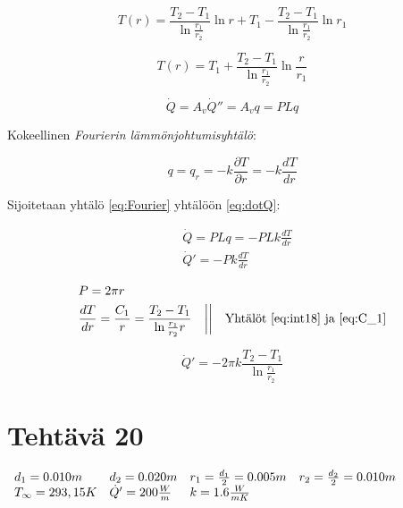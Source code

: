 \documentclass[12pt,a4paper,finnish]{article}
\begin{document}
\begin{equation}
 T(r) = \frac{T_2 - T_1}{\ln \frac{r_1}{r_2}}\ln r + T_1 - \frac{T_2 - T_1}{\ln \frac{r_1}{r_2}}\ln r_1
\end{equation}

\begin{framed}
  \begin{equation}
  T(r) = T_1 + \frac{T_2 - T_1}{\ln \frac{r_1}{r_2}}\ln \frac{r}{r_1}
  \end{equation}
\end{framed}

\begin{equation}
 \label{eq:dotQ}
 \dot{Q} = A_v\dot{Q}'' = A_vq = PLq
\end{equation}

Kokeellinen \textit{Fourierin lämmönjohtumisyhtälö}:

\begin{equation}
 \label{eq:Fourier}
 q = q_r = -k\frac{\partial T}{\partial r} = -k\frac{dT}{dr}
\end{equation}

Sijoitetaan yhtälö \ref{eq:Fourier} yhtälöön \ref{eq:dotQ}:

\begin{align}
 &\dot{Q} = PLq = -PLk\frac{dT}{dr}\\
 &\dot{Q}' = -Pk\frac{dT}{dr}
\end{align}

\begin{align}
 &P = 2\pi r\\
 &\frac{d T}{d r} = \frac{C_1}{r} = \frac{T_2 - T_1}{\ln \frac{r_1}{r_2}r}
  \quad \bigg|\bigg| \quad \text{Yhtälöt \ref{eq:int18} ja \ref{eq:C_1}}
\end{align}

\begin{framed}
 \begin{equation}
  \dot{Q}' = -2\pi k\frac{T_2 - T_1}{\ln \frac{r_1}{r_2}}
 \end{equation}
\end{framed}

\section{Tehtävä 20}

\begin{math}
 \begin{array}{l l l l}
  d_1 = 0.010 m & d_2 = 0.020 m & r_1 = \frac{d_1}{2} = 0.005m & r_2 = \frac{d_2}{2} = 0.010m\\
  T_{\infty} = 293,15K& \dot{Q}' = 200 \frac{W}{m} & k = 1.6 \frac{W}{mK}
 \end{array}
\end{math}\\
\end{document}
